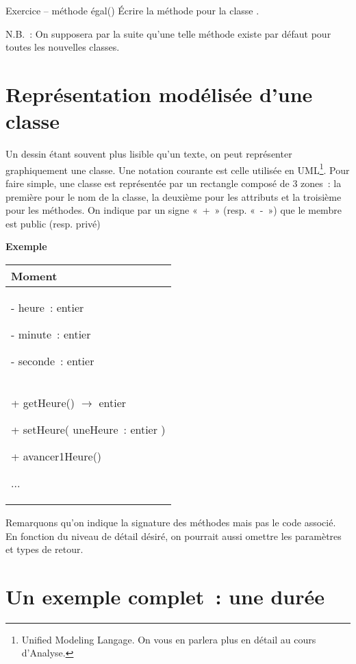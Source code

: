 	\begin{Emphase}{Exercice – méthode égal()}
		Écrire la méthode  pour la classe .
		
		N.B.~: On supposera par la suite qu'une telle méthode
		existe par défaut pour toutes les nouvelles classes.
	\end{Emphase}

\section{Représentation modélisée d'une classe}

	Un dessin étant souvent plus lisible qu'un texte, on
	peut représenter graphiquement une classe. Une notation courante est
	celle utilisée en UML\footnote{{Unified
	Modeling Langage. }On vous en parlera plus en détail au cours
	d'Analyse.}. Pour faire simple, une classe est
	représentée par un rectangle composé de 3 zones~: la première pour le
	nom de la classe, la deuxième pour les attributs et la troisième pour
	les méthodes. On indique par un signe «~+~» (resp. «~-~») que le membre
	est public (resp. privé)

	\textbf{Exemple}
	
	\begin{center}
	\begin{tabular}{|m{7cm}|}
	\hline
	\centering\arraybslash \bfseries Moment\\\hline
	{ {}- heure~: entier}
	
	{ {}- minute~: entier}
	
	 {}- seconde~: entier\\\hline
	{ + getHeure() \textsf{$\rightarrow$} entier}
	
	{ + setHeure( uneHeure~: entier )}
	
	{ + avancer1Heure()}
	
	 ...\\\hline
	\end{tabular}
	\end{center}

	Remarquons qu'on indique la signature des méthodes mais
	pas le code associé. En fonction du niveau de détail désiré, on
	pourrait aussi omettre les paramètres et types de retour.

\section{Un exemple complet~: une durée}

